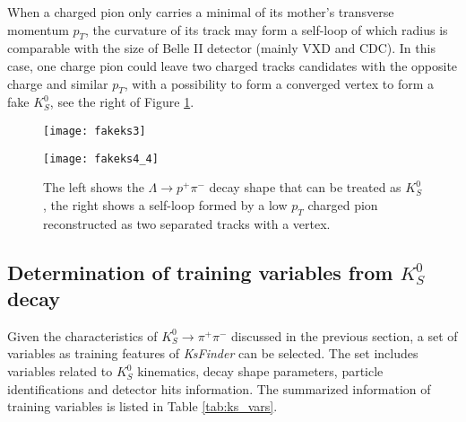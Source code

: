 When a charged pion only carries a minimal of its mother's transverse momentum $p_T$, the curvature of its track may form a self-loop of which radius is comparable with the size of Belle II detector (mainly VXD and CDC). In this case, one charge pion could leave two charged tracks candidates with the opposite charge and similar $p_T$, with a possibility to form a converged vertex to form a fake $K_S^0$, see the right of Figure \ref{fig:fakeks2}.

\begin{figure}[htbp]
	\begin{minipage}[t]{0.5\linewidth} %
		\centering 
		\texttt{[image: fakeks3]} 
		\label{fig:side:a} 
	\end{minipage}%
	\begin{minipage}[t]{0.5\linewidth} 
		\centering 
		\texttt{[image: fakeks4\_4]} 
		\label{fig:side:b} 
	\end{minipage}%
	
	\caption{The left shows the $\Lambda \to p^+ \pi^-$ decay shape that can be treated as $K_S^0$, the right shows a self-loop formed by a low $p_T$ charged pion reconstructed as two separated tracks with a vertex.}
	\label{fig:fakeks2}
\end{figure}

\subsection{Determination of training variables from $K_S^0$ decay }
Given the characteristics of  $K_S^0 \to \pi^+ \pi^-$ discussed in the previous section, a set of variables as training features of \textit{KsFinder} can be selected. The set includes variables related to $K_S^0$ kinematics, decay shape parameters, particle identifications and detector hits information. The summarized information of training variables is listed in Table \ref{tab:ks_vars}.

